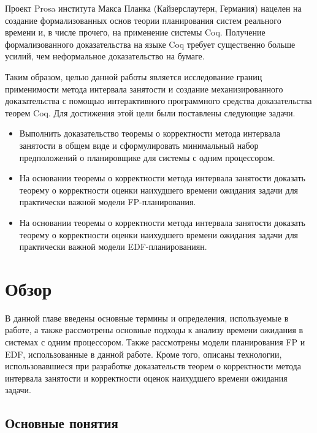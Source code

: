 Проект Prosa \cite{Prosa} института Макса Планка (Кайзерслаутерн, Германия) нацелен
  на создание формализованных основ теории планирования систем реального
  времени и, в числе прочего, на применение системы Coq.
  Получение формализованного доказательства на языке Coq требует существенно больше
  усилий, чем неформальное доказательство на бумаге.

Таким образом, целью данной работы является исследование границ применимости метода интервала занятости
  и создание механизированного доказательства с помощью интерактивного
  программного средства доказательства теорем Coq. Для достижения этой цели были поставлены
  следующие задачи.

\begin{itemize}
    \item Выполнить доказательство теоремы о корректности метода интервала занятости
      в общем виде и сформулировать минимальный набор предположений о планировщике
      для системы с одним процессором.
    \item На основании теоремы о корректности метода интервала занятости доказать
      теорему о корректности оценки наихудшего времени ожидания задачи для практически
      важной модели FP-планирования.
    \item На основании теоремы о корректности метода интервала занятости доказать
      теорему о корректности оценки наихудшего времени ожидания задачи для практически
      важной модели EDF-планированиян.
\end{itemize}

\section{Обзор}
В данной главе введены основные термины и определения, используемые в работе, а также
  рассмотрены основные подходы к анализу времени ожидания в системах с одним процессором.
  Также рассмотрены модели планирования FP и EDF, использованные в данной работе.
  Кроме того, описаны технологии, использовавшиеся при разработке доказательств
  теорем о корректности метода интервала занятости и корректности оценок наихудшего
  времени ожидания задачи.

\subsection{Основные понятия}

